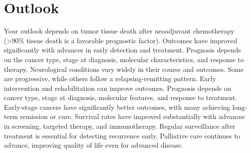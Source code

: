 \section{Outlook}
Your outlook depends on tumor tissue death after neoadjuvant chemotherapy (>90\% tissue death is a favorable prognostic factor). Outcomes have improved significantly with advances in early detection and treatment. Prognosis depends on the cancer type, stage at diagnosis, molecular characteristics, and response to therapy. Neurological conditions vary widely in their course and outcomes. Some are progressive, while others follow a relapsing-remitting pattern. Early intervention and rehabilitation can improve outcomes. Prognosis depends on cancer type, stage at diagnosis, molecular features, and response to treatment. Early-stage cancers have significantly better outcomes, with many achieving long-term remission or cure. Survival rates have improved substantially with advances in screening, targeted therapy, and immunotherapy. Regular surveillance after treatment is essential for detecting recurrence early. Palliative care continues to advance, improving quality of life even for advanced disease.
